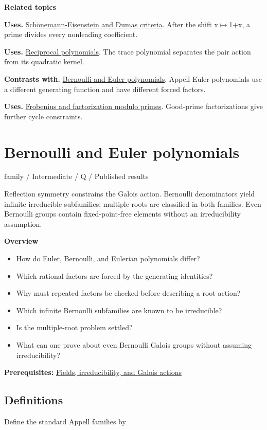 \documentclass[11pt,a4paper,oneside,openany]{book}
\begin{document}
\par\medskip\begingroup\footnotesize\setlength{\parskip}{1pt}\textbf{\sffamily\color{atlasgreen}Related topics}\par
\color{black}\textbf{Uses.} \hyperlink{article:eisenstein-dumas}{Schönemann-Eisenstein and Dumas criteria}. After the shift x\ensuremath{\mapsto}1+x, a prime divides every nonleading coefficient.\par
\color{black}\textbf{Uses.} \hyperlink{article:reciprocity}{Reciprocal polynomials}. The trace polynomial separates the pair action from its quadratic kernel.\par
\color{black}\textbf{Contrasts with.} \hyperlink{article:bernoulli-euler}{Bernoulli and Euler polynomials}. Appell Euler polynomials use a different generating function and have different forced factors.\par
\color{black}\textbf{Uses.} \hyperlink{article:frobenius}{Frobenius and factorization modulo primes}. Good-prime factorizations give further cycle constraints.\par
\endgroup
\chapter{Bernoulli and Euler polynomials}\label{article:bernoulli-euler}\hypertarget{article:bernoulli-euler}{}\color{black}
{\sffamily\small\color{atlasgold}family / Intermediate / Q / Published results}\par\medskip
Reflection symmetry constrains the Galois action. Bernoulli denominators yield infinite irreducible subfamilies; multiple roots are classified in both families. Even Bernoulli groups contain fixed-point-free elements without an irreducibility assumption.\par\medskip
\textbf{Overview}\begin{itemize}
\item How do Euler, Bernoulli, and Eulerian polynomials differ?
\item Which rational factors are forced by the generating identities?
\item Why must repeated factors be checked before describing a root action?
\item Which infinite Bernoulli subfamilies are known to be irreducible?
\item Is the multiple-root problem settled?
\item What can one prove about even Bernoulli Galois groups without assuming irreducibility?
\end{itemize}
{\small\textbf{Prerequisites:} \hyperlink{article:foundations}{Fields, irreducibility, and Galois actions}}\par
{}\section{Definitions}
\color{black} Define the standard Appell families by\par
\end{document}
